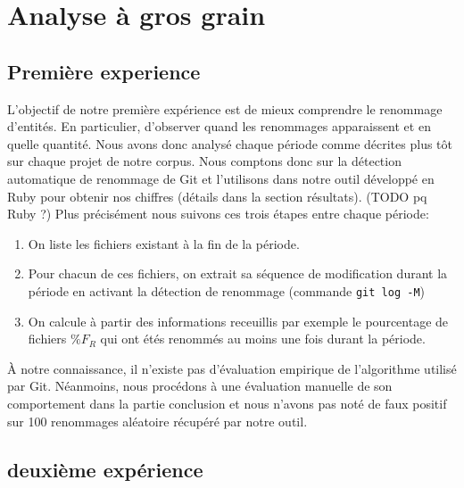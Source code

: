 \section{Analyse à gros grain}
\label{sec:analyse_gros_grain}

\subsection{Première experience}
L'objectif de notre première expérience est de mieux comprendre le renommage d'entités. En particulier, d'observer quand les renommages apparaissent et en quelle quantité. Nous avons donc analysé chaque période comme décrites plus tôt sur chaque projet de notre corpus. Nous comptons donc sur la détection automatique de renommage de Git et l'utilisons dans notre outil développé en Ruby pour obtenir nos chiffres (détails dans la section résultats). (TODO pq Ruby ?) Plus précisément nous suivons ces trois étapes entre chaque période:
\begin{enumerate}
\item On liste les fichiers existant à la fin de la période.
\item Pour chacun de ces fichiers, on extrait sa séquence de modification durant la période en activant la détection de renommage (commande \texttt{git log -M})
\item On calcule à partir des informations receuillis par exemple le pourcentage de fichiers $\%F_{R}$ qui ont étés renommés au moins une fois durant la période.
\end{enumerate}

À notre connaissance, il n'existe pas d'évaluation empirique de l'algorithme utilisé par Git. Néanmoins, nous procédons à une évaluation manuelle de son comportement dans la partie conclusion et nous n'avons pas noté de faux positif sur 100 renommages aléatoire récupéré par notre outil. \\

\subsection{deuxième expérience}


